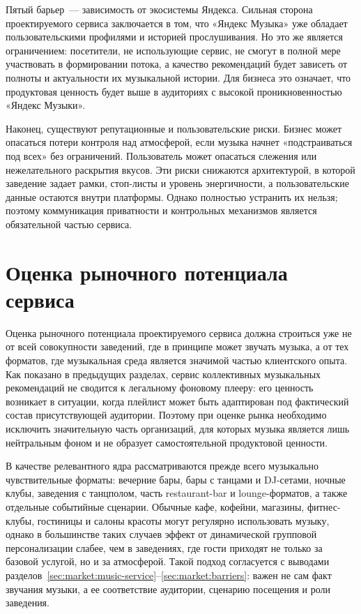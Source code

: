 Пятый барьер~--- зависимость от экосистемы Яндекса. Сильная сторона проектируемого сервиса заключается в том, что «Яндекс Музыка» уже обладает пользовательскими профилями и историей прослушивания. Но это же является ограничением: посетители, не использующие сервис, не смогут в полной мере участвовать в формировании потока, а качество рекомендаций будет зависеть от полноты и актуальности их музыкальной истории. Для бизнеса это означает, что продуктовая ценность будет выше в аудиториях с высокой проникновенностью «Яндекс Музыки».

Наконец, существуют репутационные и пользовательские риски. Бизнес может опасаться потери контроля над атмосферой, если музыка начнет «подстраиваться под всех» без ограничений. Пользователь может опасаться слежения или нежелательного раскрытия вкусов. Эти риски снижаются архитектурой, в которой заведение задает рамки, стоп-листы и уровень энергичности, а пользовательские данные остаются внутри платформы. Однако полностью устранить их нельзя; поэтому коммуникация приватности и контрольных механизмов является обязательной частью сервиса.

\section{Оценка рыночного потенциала сервиса}
\label{sec:market:potential}

Оценка рыночного потенциала проектируемого сервиса должна строиться уже не от всей совокупности заведений, где в принципе может звучать музыка, а от тех форматов, где музыкальная среда является значимой частью клиентского опыта. Как показано в предыдущих разделах, сервис коллективных музыкальных рекомендаций не сводится к легальному фоновому плееру: его ценность возникает в ситуации, когда плейлист может быть адаптирован под фактический состав присутствующей аудитории. Поэтому при оценке рынка необходимо исключить значительную часть организаций, для которых музыка является лишь нейтральным фоном и не образует самостоятельной продуктовой ценности.

В качестве релевантного ядра рассматриваются прежде всего музыкально чувствительные форматы: вечерние бары, бары с танцами и DJ-сетами, ночные клубы, заведения с танцполом, часть restaurant-bar и lounge-форматов, а также отдельные событийные сценарии. Обычные кафе, кофейни, магазины, фитнес-клубы, гостиницы и салоны красоты могут регулярно использовать музыку, однако в большинстве таких случаев эффект от динамической групповой персонализации слабее, чем в заведениях, где гости приходят не только за базовой услугой, но и за атмосферой. Такой подход согласуется с выводами разделов~\ref{sec:market:music-service}--\ref{sec:market:barriers}: важен не сам факт звучания музыки, а ее соответствие аудитории, сценарию посещения и роли заведения.

